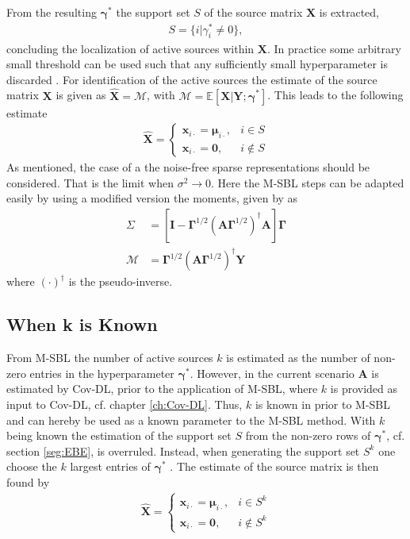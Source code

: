 From the resulting $\boldsymbol{\gamma}^\ast$ the support set $S$ of the source matrix $\mathbf{X}$ is extracted, 
\begin{align*}
S = \{ i \vert \gamma_i^{\ast} \neq 0 \},
\end{align*}
concluding the localization of active sources within $\mathbf{X}$. 
In practice some arbitrary small threshold can be used such that any sufficiently small hyperparameter is discarded \cite[p. 149]{phd_wipf}.
For identification of the active sources the estimate of the source matrix $\mathbf{X}$ is given as $\hat{\mathbf{X}} = \mathcal{M} $, with $\mathcal{M} = \mathbb{E}[\mathbf{X}\vert \mathbf{Y} ; \boldsymbol{\gamma}^{\ast}]$. 
This leads to the following estimate  
\begin{align*}
\hat{\mathbf{X}} = 
\begin{cases}
\mathbf{x}_{i\cdot} = \boldsymbol{\mu}_{i \cdot}, & i \in S \\
\mathbf{x}_{i\cdot} = \mathbf{0}, & i \not \in S
\end{cases}
\end{align*}
As mentioned, the case of a the noise-free sparse representations should be considered. 
That is the limit when $\sigma^2 \rightarrow 0$. Here the M-SBL steps can be adapted easily by using a modified version the moments, given by \cite[p. 148]{phd_wipf} as 
\begin{align*}
\Sigma &= \left[ \textbf{I} - \boldsymbol{\Gamma}^{1/2} \left( \mathbf{A} \boldsymbol{\Gamma}^{1/2}\right)^{\dagger} \mathbf{A} \right]\boldsymbol{\Gamma}\\
\mathcal{M} &= \boldsymbol{\Gamma}^{1/2}\left( \mathbf{A} \boldsymbol{\Gamma}^{1/2}\right)^{\dagger} \mathbf{Y}
\end{align*} 
where $(\cdot)^{\dagger}$ is the pseudo-inverse.

\subsection{When k is Known}\label{subsec:kestimate}
From M-SBL the number of active sources $k$ is estimated as the number of non-zero entries in the hyperparameter $\boldsymbol{\gamma}^{\ast}$.
However, in the current scenario $\mathbf{A}$ is estimated by Cov-DL, prior to the application of M-SBL, where $k$ is provided as input to Cov-DL, cf. chapter \ref{ch:Cov-DL}.
Thus, $k$ is known in prior to M-SBL and can hereby be used as a known parameter to the M-SBL method. 
With $k$ being known the estimation of the support set $S$ from the non-zero rows of $\boldsymbol{\gamma}^{\ast}$, cf. section \ref{seg:EBE}, is overruled.
Instead, when generating the support set $S^k$ one choose the $k$ largest entries of $\boldsymbol{\gamma}^{\ast}$ \cite[p. 3]{Balkan2014}.
The estimate of the source matrix is then found by
\begin{align*}
\hat{\mathbf{X}} = 
\begin{cases}
\mathbf{x}_{i\cdot} = \boldsymbol{\mu}_{i \cdot}, & i \in S^k \\
\mathbf{x}_{i\cdot} = \mathbf{0}, & i \not \in S^k
\end{cases}
\end{align*}

